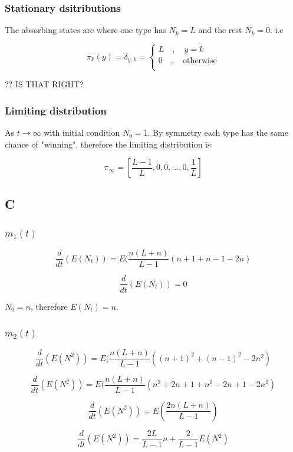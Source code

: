 \documentclass{article}
\begin{document}
\subsubsection{Stationary dsitributions}

The absorbing states are where one type has $N_k = L$ and the rest $N_k=0$. i.e

$$ \pi_k(y) = \delta_{y,k} = \begin{cases}
L \quad , \quad y=k\\
0 \quad , \quad \text{otherwise}\\
\end{cases}$$

?? IS THAT RIGHT? 
 
\subsubsection{Limiting distribution}

As $t \to \infty$ with initial condition $N_0 = 1$. By symmetry each type has the same chance of "winning", therefore the limiting distribution is

$$ \pi_{\infty} = [\frac{L-1}{L},0,0,...,0,\frac{1}{L}]$$

\subsection{C}

\subsubsection{$m_1(t)$}

$$\frac{d}{dt}(E(N_t)) = E(\frac{n(L+n)}{L-1}(n + 1 + n - 1 -2n)$$

$$\frac{d}{dt}(E(N_t)) = 0$$

$N_0 = n$, therefore $E(N_t)=n$.

\subsubsection{$m_2(t)$}

$$\frac{d}{dt}(E(N^2)) = E(\frac{n(L+n)}{L-1}((n + 1)^2 + (n - 1)^2 -2n^2)$$

$$\frac{d}{dt}(E(N^2)) = E(\frac{n(L+n)}{L-1}(n^2 + 2n + 1 + n^2 - 2n + 1 -2n^2)$$

$$\frac{d}{dt}(E(N^2)) = E(\frac{2n(L+n)}{L-1})$$

$$\frac{d}{dt}(E(N^2)) = \frac{2L}{L-1}n + \frac{2}{L-1}E(N^2)$$
\end{document}

